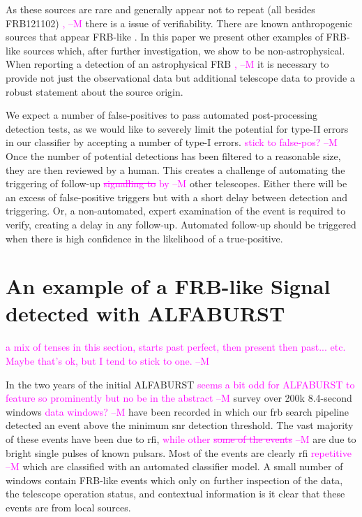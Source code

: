 \documentclass[a4paper,fleqn,usenatbib]{mnras}
\newcommand{\cM}[1]{\textcolor{magenta}{ #1 --M}}
\begin{document}
As these sources are rare
and generally appear not to repeat (all besides FRB121102)\cM{,} there is a issue
of verifiability. There are known anthropogenic sources that appear FRB-like
\citep{2011ApJ...727...18B}. In this paper we present other examples of FRB-like
sources which, after further investigation, we show to be non-astrophysical.
When reporting a detection of an astrophysical FRB\cM{,} it is necessary to provide
not just the observational data but additional telescope data to provide a
robust statement about the source origin.

We expect a number of false-positives to pass automated post-processing detection
tests, as we would like to severely limit the potential for type-II errors in
our classifier by accepting a number of type-I errors. \cM{stick to false-pos?} Once the number of
potential detections has been filtered to a reasonable size, they are then
reviewed by a human. This creates a challenge of automating the triggering of
follow-up \cM{\sout{signalling to} by} other telescopes. Either there will be an excess of
false-positive triggers but with a short delay between detection and triggering.
Or, a non-automated, expert examination of the event is required to verify,
creating a delay in any follow-up. Automated follow-up should be triggered when
there is high confidence in the likelihood of a true-positive.

\section{An example of a FRB-like Signal detected with ALFABURST}
\label{sec:D20161204} \cM{a mix of tenses in this section, starts past perfect, then present then past... etc. Maybe that's ok, but I tend to stick to one.}

In the two years of the initial ALFABURST \cM{seems a bit odd for ALFABURST to feature so prominently but no be in the abstract} survey \citep{2017ApJS..228...21C} over
200k 8.4-second windows \cM{data windows?} have been recorded in which our \gls{frb} search pipeline
detected an event above the minimum \gls{snr} detection threshold. The vast
majority of these events have been due to \gls{rfi}, \cM{while other \sout{some of the events}} are due
to bright single pulses of known pulsars. Most of the events are
clearly \gls{rfi} \cM{repetitive} which are classified with an automated classifier model. A
small number of windows contain FRB-like events which only on further inspection
of the data, the telescope operation status, and contextual information is it
clear that these events are from local sources.
\end{document}
